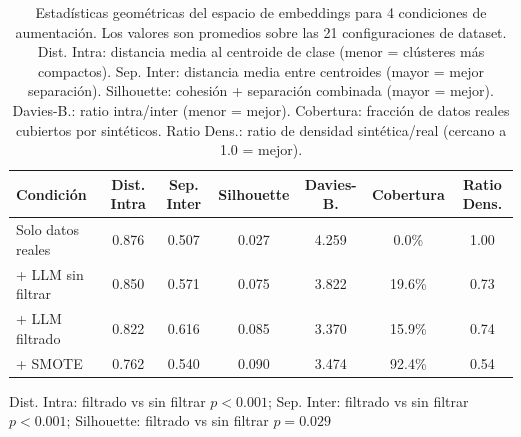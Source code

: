 \begin{table}[htbp]
\centering
\small
\caption{Estadísticas geométricas del espacio de embeddings para 4 condiciones de aumentación. Los valores son promedios sobre las 21 configuraciones de dataset. Dist. Intra: distancia media al centroide de clase (menor = clústeres más compactos). Sep. Inter: distancia media entre centroides (mayor = mejor separación). Silhouette: cohesión + separación combinada (mayor = mejor). Davies-B.: ratio intra/inter (menor = mejor). Cobertura: fracción de datos reales cubiertos por sintéticos. Ratio Dens.: ratio de densidad sintética/real (cercano a 1.0 = mejor).}
\label{tab:geometric_statistics}
\setlength{\tabcolsep}{4pt}
\begin{tabular}{lcccccc}
\toprule
\textbf{Condición} & \textbf{Dist. Intra} & \textbf{Sep. Inter} & \textbf{Silhouette} & \textbf{Davies-B.} & \textbf{Cobertura} & \textbf{Ratio Dens.} \\
\midrule
Solo datos reales & 0.876 & 0.507 & 0.027 & 4.259 & 0.0\% & 1.00 \\
+ LLM sin filtrar & 0.850 & 0.571 & 0.075 & 3.822 & 19.6\% & 0.73 \\
\rowcolor{green!10} + LLM filtrado & 0.822 & 0.616 & 0.085 & 3.370 & 15.9\% & 0.74 \\
+ SMOTE & 0.762 & 0.540 & 0.090 & 3.474 & 92.4\% & 0.54 \\
\bottomrule
\end{tabular}
\par\smallskip
{\small Dist. Intra: filtrado vs sin filtrar $p < 0.001$; Sep. Inter: filtrado vs sin filtrar $p < 0.001$; Silhouette: filtrado vs sin filtrar $p = 0.029$}
\end{table}
